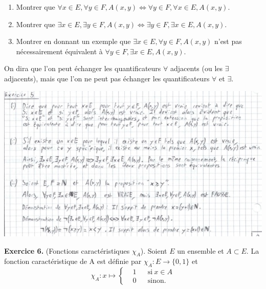 \documentclass[a4paper, 10pt]{report}
\begin{document}
	\begin{enumerate}[label=(\roman*)]
		\item Montrer que $\forall x \in E, \forall y \in F, A(x, y)
			\iff \forall y \in F, \forall x \in E, A(x, y)$.
		\item Montrer que $\exists x \in E, \exists y \in F, A(x, y)
			\iff \exists y \in F, \exists x \in E, A(x, y)$.
		\item Montrer en donnant un exemple que $\exists x \in E,
			\forall y \in F, A(x, y)$ n'est pas nécessairement
			équivalent à $\forall y \in F, \exists x \in E, A(x, y)$.
	\end{enumerate}
	On dira que l'on peut échanger les quantificateurs $\forall$
	adjacents (ou les $\exists$ adjacents), mais que l'on ne peut
	pas échanger les quantificateurs $\forall$ et $\exists$. 
	
	\includegraphics{ex05.jpg}
	
	\newpage
	
	\noindent
	\textbf{Exercice 6.} (Fonctions caractéristiques $\chi_A$).
	Soient $E$ un ensemble et $A \subset E$. La fonction
	caractéristique de A est définie par $\chi_A : E \to \{0, 1\}$ et
	\[
		\chi_A : x \mapsto \left\{
		\begin{aligned}
			&1 & &\text{si}\ x \in A\\
			&0 & &\text{sinon.}
		\end{aligned}
		\right.
	\]
	
\end{document}
